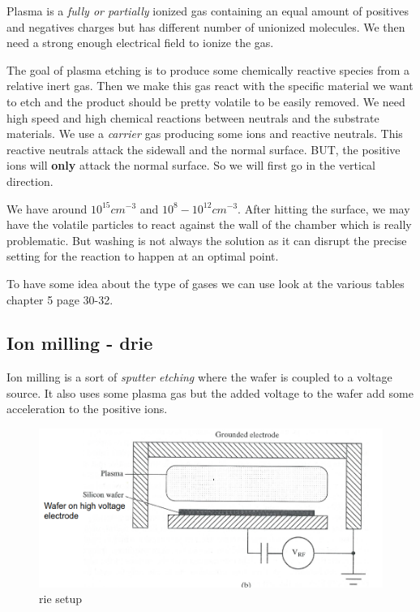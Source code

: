 \documentclass{report}
\begin{document}
Plasma is a \textit{fully or partially} ionized gas containing an equal amount of positives and negatives charges but has different number of unionized molecules. We then need a strong enough electrical field to ionize the gas.

The goal of plasma etching is to produce some chemically reactive species from a relative inert gas. Then we make this gas react with the specific material we want to etch and the product should be pretty volatile to be easily removed. We need high speed and high chemical reactions between neutrals and the substrate materials. We use a \textit{carrier} gas producing some ions and reactive neutrals. This reactive neutrals attack the sidewall and the normal surface. BUT, the positive ions will \textbf{only} attack the normal surface. So we will first go in the vertical direction.

We have around $10^{15} cm^{-3}$ and $10^8-10^{12} cm^{-3}$. After hitting the surface, we may have the volatile particles to react against the wall of the chamber which is really problematic. But washing is not always the solution as it can disrupt the precise setting for the reaction to happen at an optimal point.

To have some idea about the type of gases we can use look at the various tables chapter 5 page 30-32.

\subsection{Ion milling - \gls{drie}}

Ion milling is a sort of \textit{sputter etching} where the wafer is coupled to a voltage source. It also uses some plasma gas but the added voltage to the wafer add some acceleration to the positive ions.

\begin{figure}[H]
    \centering
    \includegraphics[width=0.75\linewidth]{rie_setup.png}
    \caption{\gls{rie} setup}
    \label{fig:rie-setup-label}
\end{figure}
\end{document}
